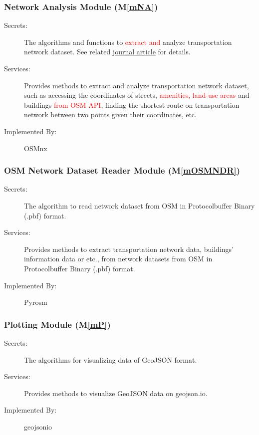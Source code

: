 \documentclass[12pt, titlepage]{article}
\newcommand{\mref}[1]{M\ref{#1}}
\begin{document}
\subsubsection{Network Analysis Module (\mref{mNA})}

\begin{description}
\item[Secrets:] The algorithms and functions to \textcolor{red}{extract and} analyze transportation network dataset. See related \href{https://geoffboeing.com/publications/osmnx-complex-street-networks/}{journal article} \citep{OSMnxArticle} for details. 
\item[Services:] Provides methods to extract and analyze transportation network dataset, such as accessing the coordinates of streets, \textcolor{red}{amenities, land-use areas} and buildings \textcolor{red}{from OSM API}, finding the shortest route on transportation network between two points given their coordinates, etc.
\item[Implemented By:] OSMnx
\end{description}

\subsubsection{OSM Network Dataset Reader Module (\mref{mOSMNDR})}

\begin{description}
\item[Secrets:]The algorithm to read network dataset from OSM in Protocolbuffer Binary (.pbf) format.
\item[Services:] Provides methods to extract transportation network data, buildings' information data or etc., from network datasets from OSM in Protocolbuffer Binary (.pbf) format.
\item[Implemented By:] Pyrosm
\end{description}

\subsubsection{Plotting Module (\mref{mP})}

\begin{description}
\item[Secrets:]The algorithms for visualizing data of GeoJSON format.
\item[Services:] Provides methods to visualize GeoJSON data on geojson.io.
\item[Implemented By:] geojsonio
\end{description}
\end{document}
